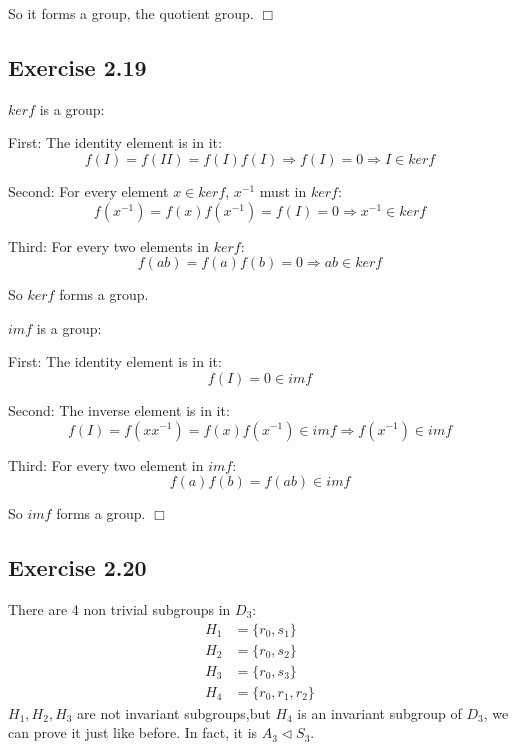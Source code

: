 \documentclass[]{ctexart}
\begin{document}
    So it forms a group, the quotient group. \qquad $ \Box $
    
    \subsection{Exercise 2.19}
    $ kerf $ is a group:
    
    First: The identity element is in it:
    \begin{equation*}
    f(I)=f(II)=f(I)f(I)\Rightarrow f(I)=0\Rightarrow I\in kerf
    \end{equation*}
    
    Second: For every element $ x\in kerf $, $ x^{-1} $ must in $ kerf $:
    \begin{equation*}
    f(x^{-1})=f(x)f(x^{-1})=f(I)=0\Rightarrow x^{-1}\in kerf
    \end{equation*}
    
    Third: For every two elements in $ kerf $:
    \begin{equation*}
    f(ab)=f(a)f(b)=0\Rightarrow ab\in kerf
    \end{equation*}
    
    So $ kerf $ forms a group.
    
    $ imf $ is a group:
    
    First: The identity element is in it:
    \begin{equation*}
    f(I)=0\in imf
    \end{equation*}
    
    Second: The inverse element is in it:
    \begin{equation*}
    f(I)=f(xx^{-1})=f(x)f(x^{-1})\in imf\Rightarrow f(x^{-1})\in imf
    \end{equation*}
    
    Third: For every two element in $imf$:
    \begin{equation*}
    f(a)f(b)=f(ab)\in imf
    \end{equation*}
    
    So $ imf $ forms a group. \qquad $ \Box $
    
    \subsection{Exercise 2.20}
    There are 4 non trivial subgroups in $ D_3 $:
    \begin{equation*}
    \begin{aligned}
      H_1&=\{r_0,s_1\}\\
      H_2&=\{r_0,s_2\}\\
      H_3&=\{r_0,s_3\}\\
      H_4&=\{r_0,r_1,r_2\}
    \end{aligned}
    \end{equation*}
    $ H_1,H_2,H_3 $ are not invariant subgroups,but $ H_4 $ is an invariant subgroup of $ D_3 $, we can prove it just like before. In fact, it is $ A_3 \lhd S_3 $. 
    
\end{document}
